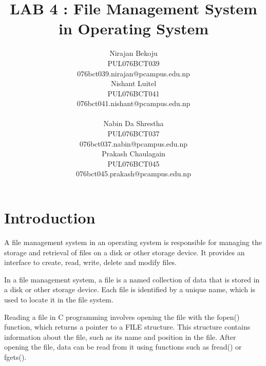 \documentclass[journal,onecolumn]{IEEEtran}
\begin{document}
\title{LAB 4 : File Management System in Operating System}

\author{
  \begin{multicols}{2}
    \centering
    Nirajan Bekoju\\
    PUL076BCT039\\
    076bct039.nirajan@pcampus.edu.np\\
    \columnbreak
    Nishant Luitel\\
    PUL076BCT041 \\
    076bct041.nishant@pcampus.edu.np \\
  \end{multicols}
  \begin{multicols}{2}
    \centering
    Nabin Da Shrestha\\
    PUL076BCT037 \\
    076bct037.nabin@pcampus.edu.np \\
    \columnbreak
    Prakash Chaulagain \\
    PUL076BCT045 \\
    076bct045.prakash@pcampus.edu.np
  \end{multicols}
}


\maketitle

\IEEEpeerreviewmaketitle

\section{Introduction}
A file management system in an operating system is responsible for managing the storage and retrieval of files on a disk or other storage device. It provides an interface to create, read, write, delete and modify files.

In a file management system, a file is a named collection of data that is stored in a disk or other storage device. Each file is identified by a unique name, which is used to locate it in the file system.

Reading a file in C programming involves opening the file with the fopen() function, which returns a pointer to a FILE structure. This structure contains information about the file, such as its name and position in the file. After opening the file, data can be read from it using functions such as fread() or fgets().
\end{document}

